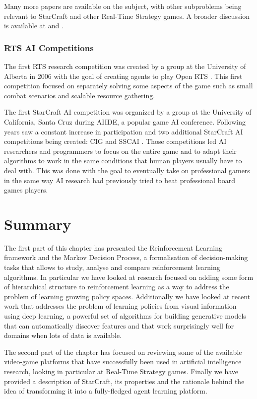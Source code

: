 Many more papers are available on the subject, with other subproblems being
relevant to StarCraft and other Real-Time Strategy games. A broader discussion
is available at \cite{ontanon2013survey} and \cite{churchill2016heuristic}.

\subsubsection{RTS AI Competitions}

The first RTS research competition was created by a group at the University of
Alberta in 2006 with the goal of creating agents to play Open RTS
\citep{buro2002orts}. This first competition focused on separately solving some
aspects of the game such as small combat scenarios and scalable resource
gathering. 

The first StarCraft AI competition was organized by a group at the University of
California, Santa Cruz during AIIDE, a popular game AI conference. Following
years saw a constant increase in participation and two additional StarCraft AI
competitions being created: CIG and SSCAI \citep{buro2012real}. Those
competitions led AI researchers and programmers to focus on the entire game and
to adapt their algorithms to work in the same conditions that human players
usually have to deal with. This was done with the goal to eventually take on
professional gamers in the same way AI research had previously tried to beat
professional board games players.

\section{Summary}

The first part of this chapter has presented the Reinforcement Learning
framework and the Markov Decision Process, a formalisation of decision-making
tasks that allows to study, analyse and compare reinforcement learning
algorithms. In particular we have looked at research focused on adding some form
of hierarchical structure to reinforcement learning as a way to address the
problem of learning growing policy spaces. Additionally we have looked at recent
work that addresses the problem of learning policies from visual information
using deep learning, a powerful set of algorithms for building generative models
that can automatically discover features and that work surprisingly well for
domains when lots of data is available.

The second part of the chapter has focused on reviewing some of the available
video-game platforms that have successfully been used in artificial intelligence
research, looking in particular at Real-Time Strategy games. Finally we have
provided a description of StarCraft, its properties and the rationale behind the
idea of transforming it into a fully-fledged agent learning platform.